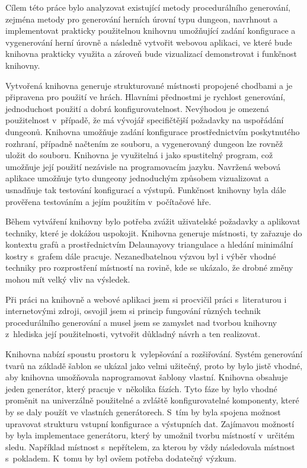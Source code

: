 Cílem této práce bylo analyzovat existující metody procedurálního generování, zejména metody pro generování herních úrovní typu dungeon, navrhnout a implementovat prakticky použitelnou knihovnu umožňující zadání konfigurace a vygenerování herní úrovně a následně vytvořit webovou aplikaci, ve které bude knihovna prakticky využita a zároveň bude vizualizací demonstrovat i funkčnost knihovny.
\par
Vytvořená knihovna generuje strukturované místnosti propojené chodbami a je připravena pro použití ve hrách.
Hlavními přednostmi je rychlost generování, jednoduchost použití a dobrá konfigurovatelnost.
Nevýhodou je omezená použitelnost v~případě, že má vývojář specifičtější požadavky na uspořádání dungeonů.
Knihovna umožňuje zadání konfigurace prostřednictvím poskytnutého rozhraní, případně načtením ze souboru, a vygenerovaný dungeon lze rovněž uložit do souboru.
Knihovna je využitelná i jako spustitelný program, což umožňuje její použití nezávisle na programovacím jazyku.
Navržená webová aplikace umožňuje tyto dungeony jednoduchým způsobem vizualizovat a usnadňuje tak testování konfigurací a výstupů.
Funkčnost knihovny byla dále prověřena testováním a jejím použitím v~počítačové hře.
\par
Během vytváření knihovny bylo potřeba zvážit uživatelské požadavky a aplikovat techniky, které je dokážou uspokojit.
Knihovna generuje místnosti, ty zařazuje do kontextu grafů a prostřednictvím Delaunayovy triangulace a hledání minimální kostry s~grafem dále pracuje.
Nezanedbatelnou výzvou byl i výběr vhodné techniky pro rozprostření místností na rovině, kde se ukázalo, že drobné změny mohou mít velký vliv na výsledek.
\par
Při práci na knihovně a webové aplikaci jsem si procvičil práci s~literaturou i internetovými zdroji, osvojil jsem si princip fungování různých technik procedurálního generování a musel jsem se zamyslet nad tvorbou knihovny z~hlediska její použitelnosti, vytvořit důkladný návrh a ten realizovat.
\par
Knihovna nabízí spoustu prostoru k~vylepšování a rozšiřování.
Systém generování tvarů na základě šablon se ukázal jako velmi užitečný, proto by bylo jistě vhodné, aby knihovna umožňovala naprogramovat šablony vlastní.
Knihovna obsahuje jeden generátor, který pracuje v~několika fázích.
Tyto fáze by bylo vhodné proměnit na univerzálně použitelné a zvláště konfigurovatelné komponenty, které by se daly použít ve vlastních generátorech.
S~tím by byla spojena možnost upravovat strukturu vstupní konfigurace a výstupních dat.
Zajímavou možností by byla implementace generátoru, který by umožnil tvorbu místností v~určitém sledu.
Například místnost s~nepřítelem, za kterou by vždy následovala místnost s~pokladem.
K~tomu by byl ovšem potřeba dodatečný výzkum.
